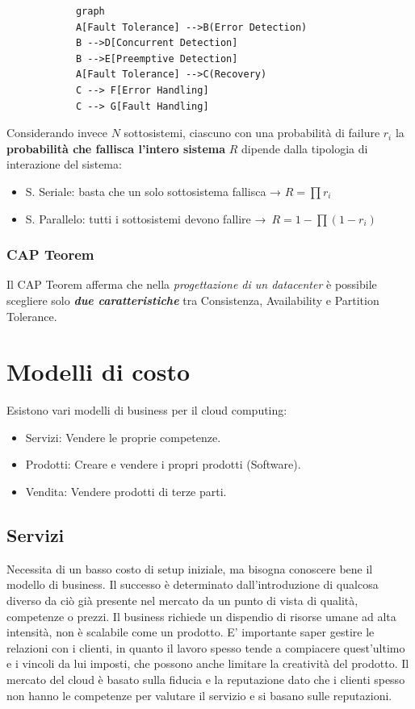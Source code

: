 \documentclass{article}
\providecommand{\tightlist}{%
		  \setlength{\itemsep}{0pt}\setlength{\parskip}{0pt}}
\begin{document}
		\begin{verbatim}
			graph
			A[Fault Tolerance] -->B(Error Detection)
			B -->D[Concurrent Detection]
			B -->E[Preemptive Detection]
			A[Fault Tolerance] -->C(Recovery)
			C --> F[Error Handling]
			C --> G[Fault Handling]
		\end{verbatim}
		
		Considerando invece \(N\) sottosistemi, ciascuno con una
		probabilità di failure \(r_i\) la \textbf{probabilità
			che fallisca l'intero sistema} \(R\) dipende dalla
		tipologia di interazione del sistema:
		
		\begin{itemize}
			\tightlist
			\item
			S. Seriale: basta che un solo sottosistema fallisca →
			\(R=\prod r_i\)
			\item
			S. Parallelo: tutti i sottosistemi devono fallire
			→~\(R = 1- \prod (1-r_i)\)
		\end{itemize}
		
		\subsubsection{CAP Teorem}\label{cap-teorem}
		
		Il CAP Teorem afferma che nella \emph{progettazione di un
			datacenter} è possibile scegliere solo \textbf{\emph{due
				caratteristiche}} tra Consistenza,
		Availability e Partition Tolerance.
		
		\newpage
		\section{Modelli di costo}
		Esistono vari modelli di business per il cloud computing:
		\begin{itemize}
			\item Servizi: Vendere le proprie competenze.
			\item Prodotti: Creare e vendere i propri prodotti (Software).
			\item Vendita: Vendere prodotti di terze parti.
		\end{itemize}
		
		\subsection{Servizi}
		Necessita di un basso costo di setup iniziale, ma bisogna conoscere bene il modello di business. Il successo è determinato dall'introduzione di qualcosa diverso da ciò già presente nel mercato da un punto di vista di qualità, competenze o prezzi.
		Il business richiede un dispendio di risorse umane ad alta intensità, non è scalabile come un prodotto. E' importante saper gestire le relazioni con i clienti, in quanto il lavoro spesso tende a compiacere quest'ultimo e i vincoli da lui imposti, che possono anche limitare la creatività del prodotto.
		Il mercato del cloud è basato sulla fiducia e la reputazione dato che i clienti spesso non hanno le competenze per valutare il servizio e si basano sulle reputazioni.
		
\end{document}
